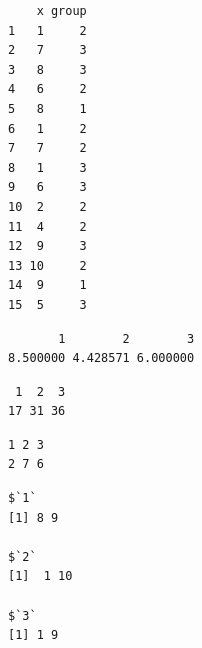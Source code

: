 \documentclass[
  letterpaper,
  DIV=11,
  numbers=noendperiod]{scrreprt}
\newenvironment{Shaded}{\begin{snugshade}}{\end{snugshade}}
\newcommand{\AttributeTok}[1]{\textcolor[rgb]{0.40,0.45,0.13}{#1}}
\newcommand{\FunctionTok}[1]{\textcolor[rgb]{0.28,0.35,0.67}{#1}}
\newcommand{\NormalTok}[1]{\textcolor[rgb]{0.00,0.23,0.31}{#1}}
\newcommand{\SpecialCharTok}[1]{\textcolor[rgb]{0.37,0.37,0.37}{#1}}
\begin{document}
\begin{verbatim}
    x group
1   1     2
2   7     3
3   8     3
4   6     2
5   8     1
6   1     2
7   7     2
8   1     3
9   6     3
10  2     2
11  4     2
12  9     3
13 10     2
14  9     1
15  5     3
\end{verbatim}

\begin{Shaded}
\end{Shaded}

\begin{verbatim}
       1        2        3 
8.500000 4.428571 6.000000 
\end{verbatim}

\begin{Shaded}
\end{Shaded}

\begin{verbatim}
 1  2  3 
17 31 36 
\end{verbatim}

\begin{Shaded}
\end{Shaded}

\begin{verbatim}
1 2 3 
2 7 6 
\end{verbatim}

\begin{Shaded}
\end{Shaded}

\begin{verbatim}
$`1`
[1] 8 9

$`2`
[1]  1 10

$`3`
[1] 1 9
\end{verbatim}
\end{document}
